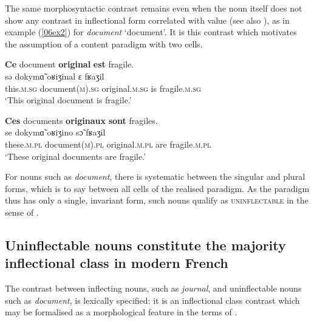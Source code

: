 \documentclass[output=paper,colorlinks,citecolor=brown]{langscibook}
\begin{document}
The same morphosyntactic contrast remains even when the noun itself does not show any contrast in inflectional form correlated with  value (see also \citealt[329]{loporcaro2011}), as in example (\ref{06ex2}) for \emph{document} `document'. It is this contrast which motivates the assumption of a content paradigm with two cells.

\begin{exe}
	\ex \label{06ex2}
	\begin{xlist}
		\ex
		\glll \textbf{Ce} document \textbf{original} \textbf{est} fragile. \\
		sǝ dokymɑ̃ oʁiʒinal ɛ fʁaʒil \\
		this.\textsc{m.sg} document\textsc{(m).sg} original.\textsc{m.sg} is fragile.\textsc{m.sg} \\
		\trans ‘This original document is fragile.’
		
		\ex
		\glll \textbf{Ces} documents \textbf{originaux} \textbf{sont} fragiles. \\
		se dokymɑ̃ oʁiʒino sɔ̃ fʁaʒil \\
		these.\textsc{m.pl} document\textsc{(m).pl} original.\textsc{m.pl} are fragile.\textsc{m.pl} \\
		\trans ‘These original documents are fragile.’
	\end{xlist}
\end{exe}

For nouns such as \emph{document}, there is systematic  between the singular and plural forms, which is to say between all cells of the realised paradigm. As the paradigm thus has only a single, invariant form, such nouns qualify as \textsc{uninflectable} in the sense of \citet{spencer2020}.

\subsection{Uninflectable nouns constitute the majority inflectional class in modern French}

The contrast between inflecting nouns, such as \emph{journal}, and uninflectable nouns such as \emph{document}, is lexically specified: it is an inflectional class contrast which may be formalised as a morphological feature in the terms of \citet[50--61]{corbett2012}.
\end{document}
